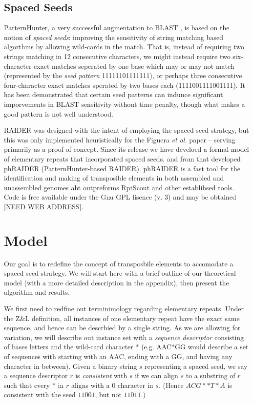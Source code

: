 \documentclass[11pt,letterpaper]{amsart}
\begin{document}
\subsection*{Spaced Seeds}
 
PatternHunter, a very successful augmentation to BLAST
\cite{Li:2004wl,Altschul:1997p843}, is based on the notion of {\it
  spaced seeds}: improving the sensitivity of string matching based
algorthms by allowing wild-cards in the match.  That is, instead of
requiring two strings matching in 12 consecutive characters, we might
instead require two six-character exact matches seperated by one base
which may or may not match (represented by the {\it seed pattern}
11111101111111), or perhaps three consecutive four-character exact
matches sperated by two bases each (1111001111001111). It has been
demonstrated that certain seed patterns can indunce significant
imporvements in BLAST sensitivity without time penalty, though what
makes a good pattern is not well understood.


RAIDER was designed with the intent of employing the spaced seed
strategy, but this was only implemented heuristically for the Figuera
{\it et al.} paper \cite{Figueroa:2013cz} -- serving primarily as a
proof-of-concept.  Since its release we have develoed a formal model
of elementary repeats that incorporated spaced seeds, and from that
developed phRAIDER (PatternHunter-based RAIDER).  phRAIDER is a fast
tool for the identification and making of transposible elements in
both assembled and unassembled genomes aht outpreforms RptScout and
other establihsed tools. Code is free available under the Gnu GPL
lisence (v. 3) and  may be obtained [NEED WEB ADDRESS].  


\section*{Model}

Our goal is to redefine the concept of transposbile elements to
accomodate a spaced seed strategy.   We will start here with a brief
outline of our theoretical model (with a more detailed description in
the appendix), then present the algorithm and results.

We first need to redfine out terminimology regarding elementary
repeats.  Under the Z\&L definition, all instances of one elementary
repeat have the exact same sequence, and hence can be descrbied by a
single string.  As we are allowing for variation, we will describe out
instance set with a {\it sequence descriptor} consisting of bases
letters and the wild-card character * (e.g. AAC*GG would describe a
set of sequences with starting with an AAC, ending with a GG, and
having any character in between).  Given a binary string $s$
representing a spaced seed, we say a sequence descriptor $r$ is
{\it consistent} with $s$ if we can align $s$ to a substring of $r$ such
that every $*$ in $r$ aligns with a $0$ character in $s$. (Hence
$ACG**T*A$ is consistent with the seed $11001$, but not $11011$.) 
\end{document}
